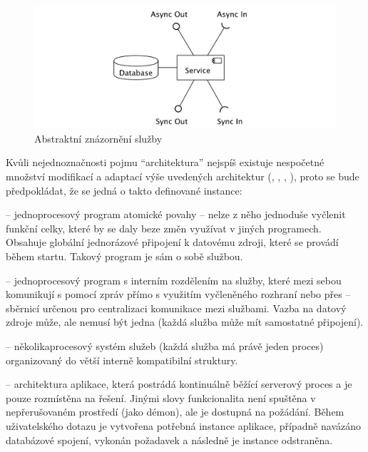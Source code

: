 \begin{figure}[htbp]
   \centering
   \includegraphics[max width=\textwidth]{assets/service}
   \caption{Abstraktní znázornění služby}\label{fig:service-abstract}
\end{figure}


Kvůli nejednoznačnosti pojmu \enquote{architektura} nejspíš existuje nespočetné množství modifikací a adaptací výše uvedených architektur (, , , ), proto se bude předpokládat, že se jedná o takto definované instance:

\begin{dl}
   \item[\g{MA}] – jednoprocesový program atomické povahy – nelze z něho jednoduše vyčlenit funkční celky, které by se daly beze změn využívat v jiných programech.
   Obsahuje globální jednorázové připojení k datovému zdroji, které se provádí během startu.
   Takový program je sám o sobě službou.
   \item[\g{SOA}] – jednoprocesový program s interním rozdělením na služby, které mezi sebou komunikují s pomocí zpráv přímo s využitím vyčleněného rozhraní nebo přes  – sběrnicí určenou pro centralizaci komunikace mezi službami.
   Vazba na datový zdroje může, ale nemusí být jedna (každá služba může mít samostatné připojení).
   \item[\g{MSA}] – několikaprocesový systém služeb (každá služba má právě jeden proces) organizovaný do větší interně kompatibilní struktury.
   \item[\g{SA}] – architektura aplikace, která postrádá kontinuálně běžící serverový proces a je pouze rozmístěna na  řešení.
   Jinými slovy funkcionalita není spuštěna v nepřerušovaném prostředí (jako démon), ale je dostupná na požádání.
   Během uživatelského dotazu je vytvořena potřebná instance aplikace, případně navázáno databázové spojení, vykonán požadavek a následně je instance odstraněna.
\end{dl}

\newpage









